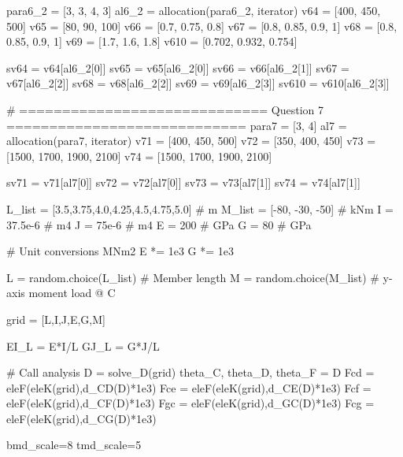 \documentclass[a4paper,11pt]{article}
\begin{document}
\begin{pycode}
	para6_2 = [3, 3, 4, 3]
	al6_2 = allocation(para6_2, iterator)
	v64 = [400, 450, 500]
	v65 = [80, 90, 100]
	v66 = [0.7, 0.75, 0.8]
	v67 = [0.8, 0.85, 0.9, 1]
	v68 = [0.8, 0.85, 0.9, 1]
	v69 = [1.7, 1.6, 1.8]
	v610 = [0.702, 0.932, 0.754]
	
	sv64 = v64[al6_2[0]]
	sv65 = v65[al6_2[0]]
	sv66 = v66[al6_2[1]]
	sv67 = v67[al6_2[2]]
	sv68 = v68[al6_2[2]]
	sv69 = v69[al6_2[3]]
	sv610 = v610[al6_2[3]]
	
	# ============================= Question 7 ============================
	para7 = [3, 4]
	al7 = allocation(para7, iterator)
	v71 = [400, 450, 500]
	v72 = [350, 400, 450]
	v73 = [1500, 1700, 1900, 2100]
	v74 = [1500, 1700, 1900, 2100]
	
	sv71 = v71[al7[0]]
	sv72 = v72[al7[0]]
	sv73 = v73[al7[1]]
	sv74 = v74[al7[1]]
	
	L_list = [3.5,3.75,4.0,4.25,4.5,4.75,5.0]  # m
	M_list = [-80, -30, -50]	# kNm
	I = 37.5e-6 	# m4
	J = 75e-6   	# m4
	E = 200     	# GPa
	G = 80      	# GPa
	
	# Unit conversions MNm2
	E *= 1e3
	G *= 1e3
	
	L = random.choice(L_list) 		# Member length
	M = random.choice(M_list) 		# y-axis moment load @ C
	
	grid = [L,I,J,E,G,M]
	
	EI_L = E*I/L
	GJ_L = G*J/L
	
	# Call analysis
	D = solve_D(grid)
	theta_C, theta_D, theta_F = D
	Fcd = eleF(eleK(grid),d_CD(D)*1e3)
	Fce = eleF(eleK(grid),d_CE(D)*1e3)
	Fcf = eleF(eleK(grid),d_CF(D)*1e3)
	Fgc = eleF(eleK(grid),d_GC(D)*1e3)
	Fcg = eleF(eleK(grid),d_CG(D)*1e3)
	
	bmd_scale=8
	tmd_scale=5
\end{pycode}
\end{document}
